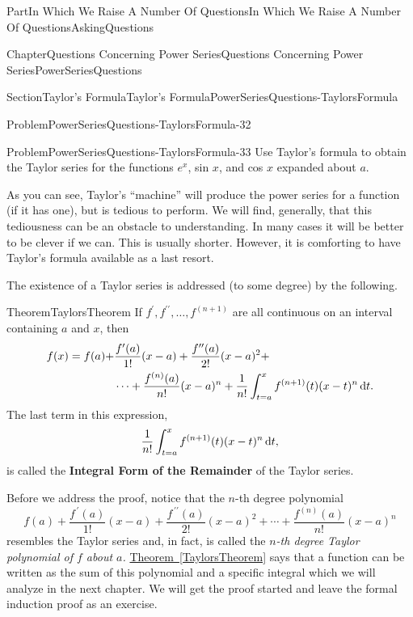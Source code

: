 \documentclass[oneside,10pt,]{book}
\newcommand{\xreffont}{\relax}
\newcommand{\terminology}[1]{\textbf{#1}}
\numberwithin{equation}{part}
\newcommand{\dx}[1]{\,{\rm d}#1}
\newcommand{\amp}{&}
\begin{document}
\begin{partptx}{Part}{In Which We Raise A Number Of Questions}{}{In Which We Raise A Number Of Questions}{}{}{AskingQuestions}
\begin{chapterptx}{Chapter}{Questions Concerning Power Series}{}{Questions Concerning Power Series}{}{}{PowerSeriesQuestions}
\begin{sectionptx}{Section}{Taylor's Formula}{}{Taylor's Formula}{}{}{PowerSeriesQuestions-TaylorsFormula}
\begin{problem}{Problem}{}{PowerSeriesQuestions-TaylorsFormula-32}
\begin{equation*}
\end{equation*}
%
\end{problem}
\begin{problem}{Problem}{}{PowerSeriesQuestions-TaylorsFormula-33}%
 Use Taylor's formula to obtain the Taylor series for the functions \(e^x\), sin \(x\), and cos \(x\) expanded about \(a\).%
\end{problem}
As you can see, Taylor's ``machine'' will produce the power series for a function (if it has one), but is tedious to perform. We will find, generally, that this tediousness can be an obstacle to understanding. In many cases it will be better to be clever if we can. This is usually shorter. However, it is comforting to have Taylor's formula available as a last resort.%
\par
The existence of a Taylor series is addressed (to some degree) by the following.%
\begin{theorem}{Theorem}{}{}{TaylorsTheorem}%
 If \(f^\prime, f^{\prime\prime}, \ldots, f^{(n+1)}\) are all continuous on an interval containing \(a\) and \(x\), then%
\begin{align*}
f(x)=f(a)+\amp{}\frac{f^{\prime}(a)}{1!}(x-a)+\frac{f^{\prime \prime}(a)}{2!}(x-a)^2 +\\
\amp{}\cdots+\frac{f^{(n)}(a)}{n!}(x-a)^n + \frac{1}{n!}\int_{t=a}^xf^{(n+1)}(t)(x-t)^n\dx{t}\text{.}
\end{align*}
The last term in this expression,%
\begin{equation*}
\frac{1}{n!}\int_{t=a}^xf^{(n+1)}(t)(x-t)^n\dx{t}\text{,}
\end{equation*}
is called the \terminology{Integral Form of the Remainder} of the Taylor series.%
\end{theorem}
Before we address the proof, notice that the \(n\)-th degree polynomial%
\begin{equation*}
f(a)+\frac{f^{\,\prime}(a)}{1!}(x-a)+\frac{f^{\,\prime\prime}(a)}{2!}(x-a)^2+\cdots+\frac{f^{(n)}(a)}{n!}(x-a)^n
\end{equation*}
resembles the Taylor series and, in fact, is called the \emph{\(n\)-th degree Taylor polynomial of \(f\) about \(a\).} \hyperref[TaylorsTheorem]{Theorem~{\xreffont\ref{TaylorsTheorem}}} says that a function can be written as the sum of this polynomial and a specific integral which we will analyze in the next chapter. We will get the proof started and leave the formal induction proof as an exercise.%

\end{sectionptx}
\end{chapterptx}
\end{partptx}
\end{document}

